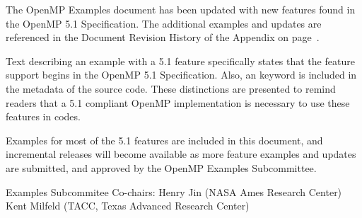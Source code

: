 \label{chap:foreword}

The OpenMP Examples document has been updated with new features
found in the OpenMP 5.1 Specification. The additional examples and updates
are referenced in the Document Revision History of the Appendix on page~\pageref{chap:history}.

Text describing an example with a 5.1 feature specifically states
that the feature support begins in the OpenMP 5.1 Specification.  Also,
an  keyword is included in the  metadata of the source code.
These distinctions are presented to remind readers that a 5.1 compliant 
OpenMP implementation is necessary to use these features in codes.

Examples for most of the 5.1 features are included in this document,
and incremental releases will become available as more feature examples
and updates are submitted, and approved by the OpenMP Examples Subcommittee.

\bigskip
Examples Subcommitee Co-chairs: \smallskip\linebreak
Henry Jin (\textsc{NASA} Ames Research Center) \linebreak
Kent Milfeld (\textsc{TACC}, Texas Advanced Research Center)


